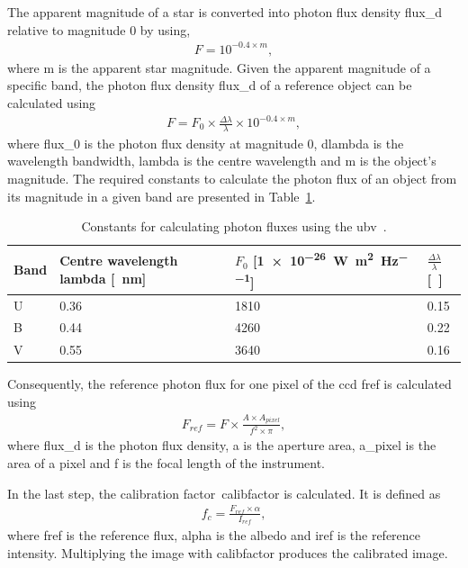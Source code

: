 The apparent magnitude of a star is converted into photon flux density \gls{flux_d} relative to magnitude 0 by using,
\begin{align}
    F = 10^{-0.4 \times m}, \label{eq:mag_flux}
\end{align}
where \gls{m} is the apparent star magnitude. Given the apparent magnitude of a specific band, the photon flux density \gls{flux_d} of a reference object can be calculated using
\begin{align}
    F = F_0 \times \frac{\Delta\lambda}{\lambda} \times 10^{-0.4 \times m}, \label{eq:comp_flux_0mag}
\end{align}
where \gls{flux_0} is the photon flux density at magnitude 0, \gls{dlambda} is the wavelength bandwidth, \gls{lambda} is the centre wavelength and \gls{m} is the object's magnitude. The required constants to calculate the photon flux of an object from its magnitude in a given band are presented in Table~\ref{tab:ubv_constants}.

\begin{table}[htb]
    \centering
    \caption{Constants for calculating photon fluxes using the \gls{ubv}~\cite{Bessell1979UBVRIPhotometry}.}
    \label{tab:ubv_constants}
    \begin{tabular}{l|l|l|l}
        \textbf{Band} & \textbf{Centre wavelength \gls{lambda} [\SI{}{\nano\meter}]} & \textbf{$F_0$ [\SI{1e-26}{\watt\per\square\meter\per\hertz}]} & \textbf{$\frac{\Delta\lambda}{\lambda}$}[~] \\ \hline
        U             & 0.36                       & 1810        & 0.15             \\
        B             & 0.44                       & 4260        & 0.22             \\
        V             & 0.55                       & 3640        & 0.16            
    \end{tabular}
\end{table}

Consequently, the reference photon flux for one pixel of the \gls{ccd} \gls{fref} is calculated using
\begin{align}
    F_{ref} = F \times \frac{A \times A_{pixel}}{f^2 \times \pi}, \label{eq:comp_flux_pix}
\end{align}
where \gls{flux_d} is the photon flux density, \gls{a} is the aperture area, \gls{a_pixel} is the area of a pixel and \gls{f} is the focal length of the instrument.

In the last step, the calibration factor~\gls{calibfactor} is calculated. It is defined as
\begin{align}
    f_c = \frac{F_{ref} \times \alpha}{I_{ref}}, \label{eq:comp_cal_fac}
\end{align}
where \gls{fref} is the reference flux, \gls{alpha} is the albedo and \gls{iref} is the reference intensity. Multiplying the image with \gls{calibfactor} produces the calibrated image.

